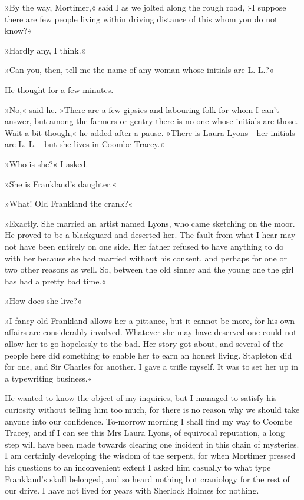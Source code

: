 »By the way, Mortimer,« said I as we jolted along the rough road, »I suppose there are few people living within driving distance of this whom you do not know?«

»Hardly any, I think.«

»Can you, then, tell me the name of any woman whose initials are L. L.?«

He thought for a few minutes.

»No,« said he. »There are a few gipsies and labouring folk for whom I can't answer, but among the farmers or gentry there is no one whose initials are those. Wait a bit though,« he added after a pause. »There is Laura Lyons\allowbreak---\allowbreak her initials are L. L.\allowbreak---\allowbreak but she lives in Coombe Tracey.«

»Who is she?« I asked.

»She is Frankland's daughter.«

»What! Old Frankland the crank?«

»Exactly. She married an artist named Lyons, who came sketching on the moor. He proved to be a blackguard and deserted her. The fault from what I hear may not have been entirely on one side. Her father refused to have anything to do with her because she had married without his consent, and perhaps for one or two other reasons as well. So, between the old sinner and the young one the girl has had a pretty bad time.«

»How does she live?«

»I fancy old Frankland allows her a pittance, but it cannot be more, for his own affairs are considerably involved. Whatever she may have deserved one could not allow her to go hopelessly to the bad. Her story got about, and several of the people here did something to enable her to earn an honest living. Stapleton did for one, and Sir Charles for another. I gave a trifle myself. It was to set her up in a typewriting business.«

He wanted to know the object of my inquiries, but I managed to satisfy his curiosity without telling him too much, for there is no reason why we should take anyone into our confidence. To-morrow morning I shall find my way to Coombe Tracey, and if I can see this Mrs Laura Lyons, of equivocal reputation, a long step will have been made towards clearing one incident in this chain of mysteries. I am certainly developing the wisdom of the serpent, for when Mortimer pressed his questions to an inconvenient extent I asked him casually to what type Frankland's skull belonged, and so heard nothing but craniology for the rest of our drive. I have not lived for years with Sherlock Holmes for nothing.

